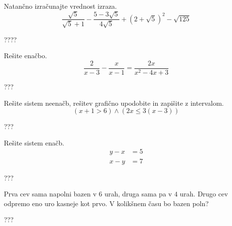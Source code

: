 \documentclass[addpoints]{exam}
\begin{document}
     
     \begin{questions}
     
     
         \question[6]
         Natančno izračunajte vrednost izraza.
         $$ \dfrac{\sqrt{5}}{\sqrt{5}+1}-\dfrac{5-3\sqrt{5}}{4\sqrt{5}}+\left(2+\sqrt{5}\right)^2-\sqrt{125} $$
     
         \begin{solution}[6cm]
             ????
         \end{solution}
         
         
         \newpage
     
         \question[4]
         Rešite enačbo.
         $$ \dfrac{2}{x-3}-\dfrac{x}{x-1}=\dfrac{2x}{x^2-4x+3} $$
         
         
         \begin{solution}[9cm]
             ???
         \end{solution}
     
             
     
     
         \question[5]
         Rešite sistem neenačb, rešitev grafično upodobite in zapišite z intervalom.
         $$ \left(x+1>6\right)\land\left(2x\leq 3(x-3)\right) $$
         
         
         \begin{solution}[8cm]
             ???
         \end{solution}
     
     
         \newpage 
     
     
         \question[4]
         Rešite sistem enačb.
         $$ \begin{aligned}
             y-x&=5 \\ x-y&=7
         \end{aligned} $$
         
         
         \begin{solution}[9cm]
             ???
         \end{solution}
     
     
     
         \question[4]
         Prva cev sama napolni bazen v $6$ urah, druga sama pa v $4$ urah. Drugo cev odpremo eno uro kasneje kot prvo.
         V kolikšnem času bo bazen poln?
         
         
         \begin{solution}[8cm]
             ???
         \end{solution}
     

\end{questions}
\end{document}
